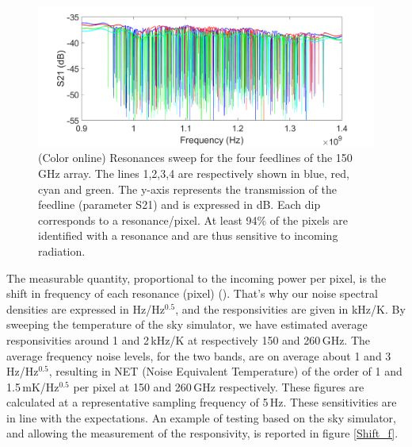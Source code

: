 \documentclass[]{aa} %
\begin{document}
\begin{figure}[h]
\begin{center}
   \centering
    \includegraphics[width=1.05\linewidth]{VNA_scans_150GHz.png}
    \caption{(Color online) Resonances sweep for the four feedlines of the 150\,GHz array. The lines 1,2,3,4 are respectively shown in blue, red, cyan and green. The y-axis represents the transmission of the feedline (parameter S21) and is expressed in dB. Each dip corresponds to a resonance/pixel. At least 94\% of the pixels are identified with a resonance and are thus sensitive to incoming radiation.}
         \label{VNA}
\end{center}
\end{figure}

The measurable quantity, proportional to the incoming power per pixel, is the shift in frequency of each resonance (pixel) (\cite{Swenson2010}). That's why our noise spectral densities are expressed in Hz/Hz$^{0.5}$, and the responsivities are given in kHz/K. By sweeping the temperature of the sky simulator, we have estimated average responsivities around 1 and 2\,kHz/K at respectively 150 and 260\,GHz. The average frequency noise levels, for the two bands, are on average about 1 and 3\,Hz/Hz$^{0.5}$, resulting in NET (Noise Equivalent Temperature) of the order of 1 and 1.5\,mK/Hz$^{0.5}$ per pixel at 150 and 260\,GHz respectively. These figures are calculated at a representative sampling frequency of 5\,Hz. 
These sensitivities are in line with the expectations. An example of testing based on the sky simulator, and allowing the measurement of the responsivity, is reported in figure \ref{Shift_f}. 
\end{document}
